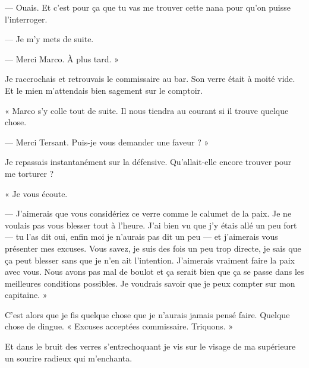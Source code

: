 — Ouais. Et c'est pour ça que tu vas me trouver cette nana pour qu'on puisse l'interroger.

— Je m'y mets de suite. 

— Merci Marco. À plus tard. »

Je raccrochais et retrouvais le commissaire au bar. Son verre était à moité vide. Et le mien m'attendais bien sagement 
sur le comptoir.

« Marco s'y colle tout de suite. Il nous tiendra au courant si il trouve quelque chose.

— Merci Tersant. Puis-je vous demander une faveur ? »

Je repassais instantanément sur la défensive. Qu'allait-elle encore trouver pour me torturer ?

« Je vous écoute.

— J'aimerais que vous considériez ce verre comme le calumet de la paix. Je ne voulais pas vous blesser tout à l'heure. 
J'ai bien vu que j'y étais allé un peu fort — tu l'as dit oui, enfin moi je n'aurais pas dit un peu — et j'aimerais 
vous présenter mes excuses. Vous savez, je suis des fois un peu trop directe, je sais que ça peut blesser sans que je 
n'en ait l'intention. J'aimerais vraiment faire la paix avec vous. Nous avons pas mal de boulot et ça serait bien 
que ça se passe dans les meilleures conditions possibles. Je voudrais savoir que je peux compter sur mon capitaine. »

C'est alors que je fis quelque chose que je n'aurais jamais pensé faire. Quelque chose de dingue. « Excuses acceptées 
commissaire. Triquons. »

Et dans le bruit des verres s'entrechoquant je vis sur le visage de ma supérieure un sourire radieux qui m'enchanta.
